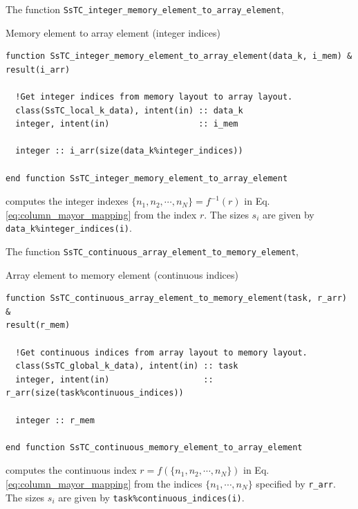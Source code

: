 \documentclass[10pt,a4paper]{article}
\begin{document}
The function \verb|SsTC_integer_memory_element_to_array_element|,
\begin{codebox}{Memory element to array element (integer indices)}
\begin{lstlisting}[caption={Interface of ``integer memory element to array element".},captionpos=b]
function SsTC_integer_memory_element_to_array_element(data_k, i_mem) &
result(i_arr)

  !Get integer indices from memory layout to array layout.
  class(SsTC_local_k_data), intent(in) :: data_k
  integer, intent(in)                  :: i_mem

  integer :: i_arr(size(data_k%integer_indices))
  
end function SsTC_integer_memory_element_to_array_element
\end{lstlisting}
\end{codebox}
computes the integer indexes $\{n_1, n_2, \cdots, n_N\} = f^{-1}(r)$ in Eq. \eqref{eq:column_mayor_mapping} from the index $r$. The sizes $s_i$ are given by \verb|data_k%integer_indices(i)|.

The function \verb|SsTC_continuous_array_element_to_memory_element|,
\begin{codebox}{Array element to memory element (continuous indices)}
\begin{lstlisting}[caption={Interface of ``continuous array element to memory element".},captionpos=b]
function SsTC_continuous_array_element_to_memory_element(task, r_arr) &
result(r_mem)

  !Get continuous indices from array layout to memory layout.
  class(SsTC_global_k_data), intent(in) :: task
  integer, intent(in)                   :: r_arr(size(task%continuous_indices))

  integer :: r_mem
  
end function SsTC_continuous_memory_element_to_array_element
\end{lstlisting}
\end{codebox}
computes the continuous index $r = f(\{n_1, n_2, \cdots, n_N\})$ in Eq. \eqref{eq:column_mayor_mapping} from the indices $\{n_1, \cdots, n_N\}$ specified by \verb|r_arr|. The sizes $s_i$ are given by \verb|task%continuous_indices(i)|.
\end{document}
